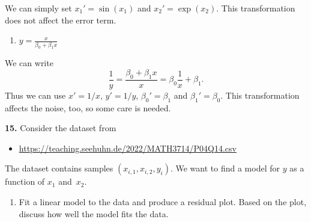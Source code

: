 \documentclass[
  a4paper,
]{article}
\providecommand{\tightlist}{%
  \setlength{\itemsep}{0pt}\setlength{\parskip}{0pt}}
\theoremstyle{definition}
\theoremstyle{definition}
\theoremstyle{definition}
\theoremstyle{definition}
\theoremstyle{remark}
\begin{document}
\begin{myanswers}
We can simply set \(x_1' = \sin(x_1)\) and \(x_2' = \exp(x_2)\).
This transformation does not affect the error term.

\end{myanswers}

\begin{enumerate}
\def\labelenumi{\alph{enumi}.}
\setcounter{enumi}{2}
\tightlist
\item
  \(y = \frac{x}{\beta_0 + \beta_1 x}\)
\end{enumerate}

\begin{myanswers}
We can write
\begin{equation*}
  \frac1y
  = \frac{\beta_0 + \beta_1 x}{x}
  = \beta_0 \frac1x + \beta_1.
\end{equation*}
Thus we can use \(x' = 1/x\), \(y' = 1/y\), \(\beta_0' = \beta_1\) and
\(\beta_1' = \beta_0\). This transformation affects the noise, too,
so some care is needed.

\end{myanswers}

\textbf{15.} Consider the dataset from

\begin{itemize}
\tightlist
\item
  \url{https://teaching.seehuhn.de/2022/MATH3714/P04Q14.csv}
\end{itemize}

The dataset contains samples \((x_{i,1}, x_{i,2}, y_i)\). We want to
find a model for \(y\) as a function of \(x_1\) and~\(x_2\).

\begin{enumerate}
\def\labelenumi{\alph{enumi}.}
\tightlist
\item
  Fit a linear model to the data and produce a residual plot.
  Based on the plot, discuss how well the model fits the data.
\end{enumerate}
\end{document}
